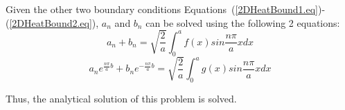 Given the other two boundary conditions Equations~(\ref{2DHeatBound1.eq})-(\ref{2DHeatBound2.eq}), $a_n$ and $b_n$ can be solved using the following 2 equations:
\begin{equation}
a_n+b_n=\sqrt{\frac{2}{a}}\int_{0}^{a}f(x)sin\frac{n\pi}{a}xdx
\end{equation}
\begin{equation}
a_ne^{\frac{n\pi}{a}b}+b_ne^{-\frac{n\pi}{a}b}=\sqrt{\frac{2}{a}}\int_{0}^{a}g(x)sin\frac{n\pi}{a}xdx
\end{equation}

Thus, the analytical solution of this problem is solved.















